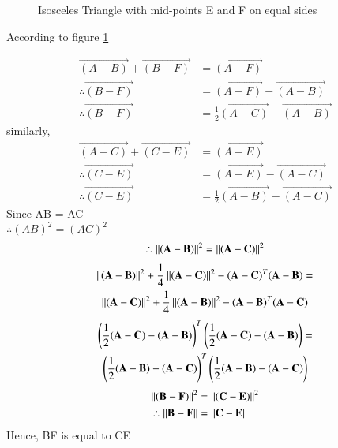 \begin{figure}[!h]
\centering
\resizebox{\columnwidth}{!}{}
\caption{Isosceles Triangle with mid-points E and F on equal sides}
\label{eq:solutions/1/16/myfig}
\end{figure}
According to figure \ref{eq:solutions/1/16/myfig}

\begin{align}
\vec{(A-B)}+\vec{(B-F)} &= \vec{(A-F)}\\
\therefore \vec{(B-F)} &= \vec{(A-F)}-\vec{(A-B)}\\
\therefore \vec{(B-F)} &= \frac{1}{2}\vec{(A-C)}-\vec{(A-B)}
\end{align}
similarly,
\begin{align}
\vec{(A-C)}+\vec{(C-E)} &= \vec{(A-E)}\\
\therefore \vec{(C-E)} &= \vec{(A-E)}-\vec{(A-C)}\\
\therefore \vec{(C-E)} &= \frac{1}{2}\vec{(A-B)}-\vec{(A-C)}
\end{align}
Since AB = AC\\
$\therefore (AB)^2 = (AC)^2$\\
\begin{align}
\therefore\left\lVert\mathbf{(A-B)}\right\rVert^2 = \left\lVert\mathbf{(A-C)}\right\rVert^2
\end{align}
\begin{multline}
\left\lVert\mathbf{(A-B)}\right\rVert^2+\frac{1}{4}\left\lVert\mathbf{(A-C)}\right\rVert^2 -\mathbf{(A-C)}^T\mathbf{(A-B)} =\\
\left\lVert\mathbf{(A-C)}\right\rVert^2+\frac{1}{4}\left\lVert\mathbf{(A-B)}\right\rVert^2 -\mathbf{(A-B)}^T\mathbf{(A-C)} \end{multline}
\begin{multline}
\left(\frac{1}{2}\mathbf{(A-C)}-\mathbf{(A-B)}\right)^T\left(\frac{1}{2}\mathbf{(A-C)}-\mathbf{(A-B)}\right)=\\
\left(\frac{1}{2}\mathbf{(A-B)}-\mathbf{(A-C)}\right)^T\left(\frac{1}{2}\mathbf{(A-B)}-\mathbf{(A-C)}\right)
\end{multline}
\begin{align}
\left\lVert\mathbf{(B-F)}\right\rVert^2 &= \left\lVert\mathbf{(C-E)}\right\rVert^2\\
\therefore\left\lVert\mathbf{B-F}\right\rVert &= \left\lVert\mathbf{C-E}\right\rVert
\end{align}
Hence, BF is equal to CE
